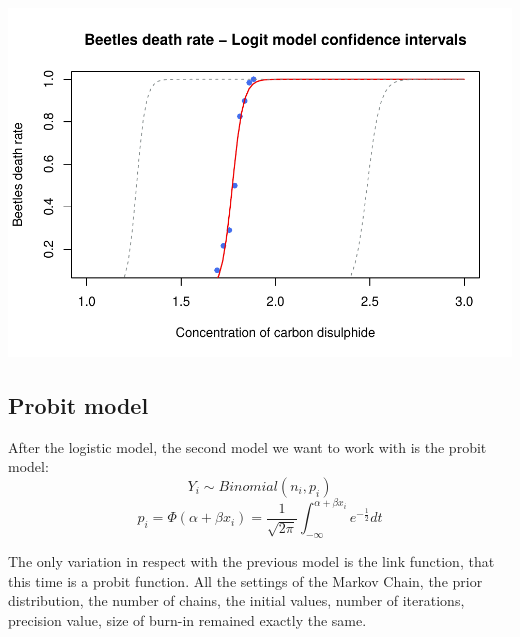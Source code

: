 \documentclass[]{article}
\begin{document}
\includegraphics{FinalProject-SDSII_files/figure-latex/unnamed-chunk-15-1.pdf}

\hypertarget{probit-model}{%
\subsection{Probit model}\label{probit-model}}

After the logistic model, the second model we want to work with is the
probit model: \[ Y_i \sim Binomial(n_i, p_i)\]
\[ p_i = \Phi(\alpha + \beta x_i) = \frac{1}{\sqrt{2\pi}}\int _{-\infty }^{\alpha + \beta x_i}e^{-\frac{1}{2}}dt \]

The only variation in respect with the previous model is the link
function, that this time is a probit function. All the settings of the
Markov Chain, the prior distribution, the number of chains, the initial
values, number of iterations, precision value, size of burn-in remained
exactly the same.
\end{document}
